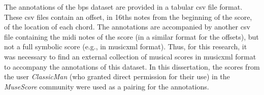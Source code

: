

The annotations of the \gls{bps} dataset are provided in a
tabular \gls{csv} file format. These \gls{csv} files contain
an offset, in \glspl{16th} notes from the beginning of the
score, of the location of each chord. The annotations are
accompanied by another \gls{csv} file containing the
\gls{midi} notes of the score (in a similar format for the
offsets), but not a full symbolic score (e.g., in
\gls{musicxml} format). Thus, for this research, it was
necessary to find an external collection of musical scores
in \gls{musicxml} format to accompany the annotations of
this dataset. In this dissertation, the scores from the user
\emph{ClassicMan} (who granted direct permission for their
use) in the \emph{MuseScore} community were used as a
pairing for the
annotations.
